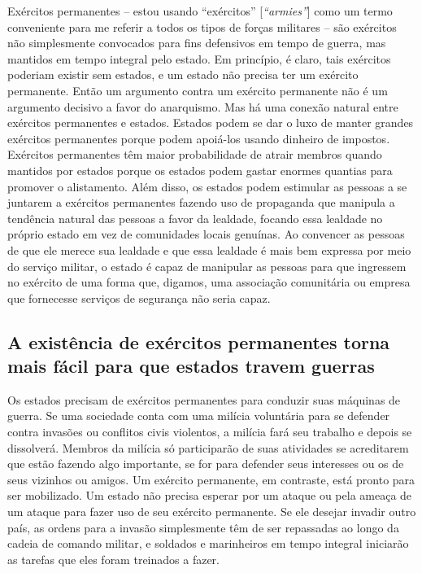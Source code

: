 Exércitos permanentes -- estou usando ``exércitos'' [\emph{``armies''}] como um termo conveniente para me referir a todos os tipos de forças militares -- são exércitos não simplesmente convocados para fins defensivos em tempo de guerra, mas mantidos em tempo integral pelo estado. Em princípio, é claro, tais exércitos poderiam existir sem estados, e um estado não precisa ter um exército permanente. Então um argumento contra um exército permanente não é um argumento decisivo a favor do anarquismo. Mas há uma conexão natural entre exércitos permanentes e estados. Estados podem se dar o luxo de manter grandes exércitos permanentes porque podem apoiá-los usando dinheiro de impostos. Exércitos permanentes têm maior probabilidade de atrair membros quando mantidos por estados porque os estados podem gastar enormes quantias para promover o alistamento. Além disso, os estados podem estimular as pessoas a se juntarem a exércitos permanentes fazendo uso de propaganda que manipula a tendência natural das pessoas a favor da lealdade, focando essa lealdade no próprio estado em vez de comunidades locais genuínas. Ao convencer as pessoas de que ele merece sua lealdade e que essa lealdade é mais bem expressa por meio do serviço militar, o estado é capaz de manipular as pessoas para que ingressem no exército de uma forma que, digamos, uma associação comunitária ou empresa que fornecesse serviços de segurança não seria capaz.

\subsection*{A existência de exércitos permanentes torna mais fácil para que estados travem guerras}

Os estados precisam de exércitos permanentes para conduzir suas máquinas de guerra. Se uma sociedade conta com uma milícia voluntária para se defender contra invasões ou conflitos civis violentos, a milícia fará seu trabalho e depois se dissolverá. Membros da milícia só participarão de suas atividades se acreditarem que estão fazendo algo importante, se for para defender seus interesses ou os de seus vizinhos ou amigos. Um exército permanente, em contraste, está pronto para ser mobilizado. Um estado não precisa esperar por um ataque ou pela ameaça de um ataque para fazer uso de seu exército permanente. Se ele desejar invadir outro país, as ordens para a invasão simplesmente têm de ser repassadas ao longo da cadeia de comando militar, e soldados e marinheiros em tempo integral iniciarão as tarefas que eles foram treinados a fazer.

